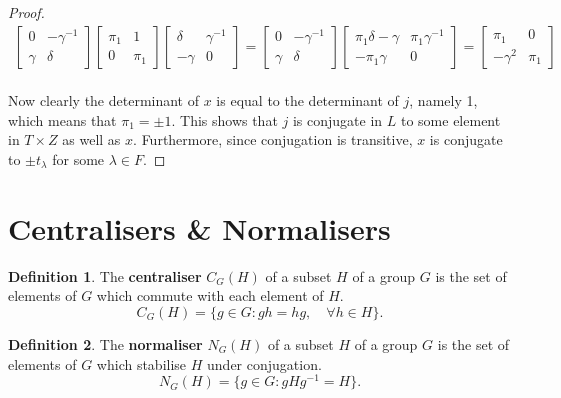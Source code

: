 \documentclass[a4paper , 11pt]{book}
\theoremstyle{definition}
\newtheorem*{definition-non}{Definition}
\theoremstyle{remark}
\begin{document}
\begin{proof}
\begin{align*} \begin{bmatrix} 0 & -\gamma^{-1} \\ \gamma & \delta \end{bmatrix} \begin{bmatrix} \pi_1 & 1 \\ 0 & \pi_1 \end{bmatrix} \begin{bmatrix} \delta & \gamma^{-1} \\ -\gamma & 0 \end{bmatrix} = \begin{bmatrix} 0 & -\gamma^{-1} \\ \gamma & \delta \end{bmatrix} \begin{bmatrix} \pi_1 \delta - \gamma & \pi_1 \gamma^{-1} \\ -\pi_1 \gamma & 0 \end{bmatrix} = \begin{bmatrix} \pi_1 & 0 \\ -\gamma^{2} & \pi_1 \end{bmatrix}
\end{align*}
\\
Now clearly the determinant of $x$ is equal to the determinant of $j$, namely 1, which means that $\pi_1 = \pm 1$. This shows that $j$ is conjugate in $L$ to some element in $T \times Z$ as well as $x$. Furthermore, since conjugation is transitive, $x$ is conjugate to $\pm t_\lambda$ for some $\lambda \in F$.

\end{proof}

\section{Centralisers \& Normalisers}

\begin{definition-non}
The \textbf{centraliser} $C_G(H)$ of a subset $H$ of a group $G$ is the set of elements of $G$ which commute with each element of $H$.
\begin{equation*} C_G(H) = \{ g \in G  : gh=hg, \quad \forall h\in H \}. \end{equation*} 
\end{definition-non}

\begin{definition-non}
The \textbf{normaliser} $N_G(H)$ of a subset $H$ of a group $G$ is the set of elements of $G$ which stabilise $H$ under conjugation.
\begin{equation*} N_G(H) = \{ g \in G : gHg^{-1}=H\}. \end{equation*}
\end{definition-non}
\end{document}
